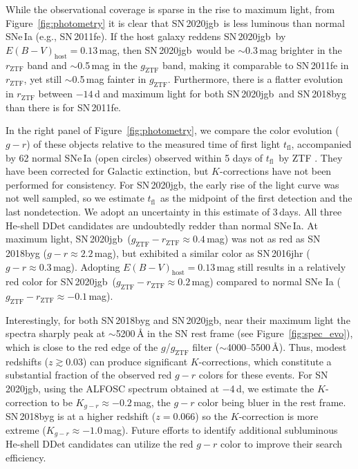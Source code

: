\documentclass[twocolumn]{aastex631}
\newcommand{\sn}{SN\,2020jgb}
\newcommand{\tfl}{$t_\mathrm{fl}$}
\begin{document}
While the observational coverage is sparse in the rise to maximum light, from Figure~\ref{fig:photometry} it is clear that \sn\ is less luminous than normal SNe\,Ia (e.g., SN\,2011fe). If the host galaxy reddens \sn\ by $E(B-V)_\mathrm{host} = 0.13$\,mag, then \sn\ would be $\sim$0.3\,mag brighter in the $r_\mathrm{ZTF}$ band and $\sim$0.5\,mag in the $g_\mathrm{ZTF}$ band, making it comparable to SN\,2011fe in $r_\mathrm{ZTF}$, yet still $\sim$0.5\,mag fainter in $g_\mathrm{ZTF}$. Furthermore, there is a flatter evolution in $r_\mathrm{ZTF}$ between $-14$\,d and maximum light for both \sn\ and SN\,2018byg than there is for SN\,2011fe.  

In the right panel of Figure~\ref{fig:photometry}, we compare the color evolution ($g-r$) of these objects relative to the measured time of first light \tfl, accompanied by 62 normal SNe\,Ia (open circles) observed within 5 days of \tfl\ by ZTF \citep[from][]{Bulla2020}. They have been corrected for Galactic extinction, but $K$-corrections have not been performed for consistency. For \sn, the early rise of the light curve was not well sampled, so we estimate \tfl\ as the midpoint of the first detection and the last nondetection. We adopt an uncertainty in this estimate of 3\,days. All three He-shell DDet candidates are undoubtedly redder than normal SNe\,Ia. At maximum light, \sn\ ($g_\mathrm{ZTF}-r_\mathrm{ZTF}\approx0.4$\,mag) was not as red as SN\,2018byg ($g-r\approx2.2$\,mag), but exhibited a similar color as SN\,2016jhr ($g-r\approx0.3$\,mag). Adopting $E(B-V)_\mathrm{host} = 0.13$\,mag still results in a relatively red color for \sn\ ($g_\mathrm{ZTF}-r_\mathrm{ZTF}\approx0.2$\,mag) compared to normal SNe Ia ($g_\mathrm{ZTF}-r_\mathrm{ZTF}\approx-0.1$\,mag).

Interestingly, for both SN\,2018byg and \sn, near their maximum light the spectra sharply peak at $\sim$5200\,\r{A} in the SN rest frame (see Figure~\ref{fig:spec_evo}), which is close to the red edge of the $g$/$g_\mathrm{ZTF}$ filter ($\sim$4000--5500\,\r{A}). Thus, modest redshifts ($z\gtrsim0.03$) can produce significant $K$-corrections, which constitute a substantial fraction of the observed red $g-r$ colors for these events. For \sn, using the ALFOSC spectrum obtained at $-$4\,d, we estimate the $K$-correction to be $K_{g-r}\approx -0.2$\,mag, the $g-r$ color being bluer in the rest frame. SN\,2018byg is at a higher redshift ($z=0.066$) so the $K$-correction is more extreme ($K_{g-r}\approx-1.0$\,mag). Future efforts to identify additional subluminous He-shell DDet candidates can utilize the red $g-r$ color to improve their search efficiency.
\end{document}
